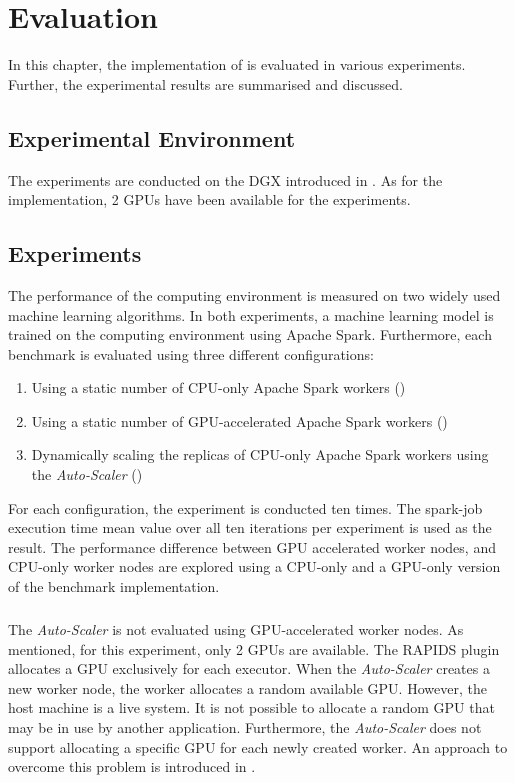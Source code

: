 \chapter{Evaluation}
\label{chap:07_evaluation}

In this chapter, the implementation of  is evaluated in various experiments. Further, the experimental results are summarised and discussed.

\section{Experimental Environment}
%
The experiments are conducted on the DGX introduced in .
As for the implementation, 2 GPUs have been available for the experiments.


\section{Experiments}
The performance of the computing environment is measured on two widely used machine learning algorithms.
In both experiments, a machine learning model is trained on the computing environment using Apache Spark. Furthermore, each benchmark is evaluated using three different configurations:
\begin{enumerate}
\item Using a static number of CPU-only Apache Spark workers ()
\item Using a static number of GPU-accelerated Apache Spark workers ()
\item Dynamically scaling the replicas of CPU-only Apache Spark workers using the \textit{Auto-Scaler} ()
\end{enumerate}
For each configuration, the experiment is conducted ten times. The spark-job execution time mean value over all ten iterations per experiment is used as the result.
The performance difference between GPU accelerated worker nodes, and CPU-only worker nodes are explored using a CPU-only and a GPU-only version of the benchmark implementation.

\paragraph{}
The \textit{Auto-Scaler} is not evaluated using GPU-accelerated worker nodes. As mentioned, for this experiment, only 2 GPUs are available. The RAPIDS plugin allocates a GPU exclusively for each executor. When the \textit{Auto-Scaler} creates a new worker node, the worker allocates a random available GPU.
However, the host machine is a live system. It is not possible to allocate a random GPU that may be in use by another application. Furthermore, the \textit{Auto-Scaler} does not support allocating a specific GPU for each newly created worker. An approach to overcome this problem is introduced in .

